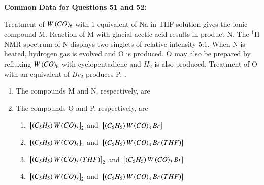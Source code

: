 \documentclass[journal,12pt,onecolumn]{IEEEtran}
\theoremstyle{remark}
\begin{document}
\textbf{Common Data for Questions 51 and 52:}

Treatment of $W\left(CO\right)_6$ with 1 equivalent of Na in THF solution gives the ionic compound M. Reaction of M with glacial acetic acid results in product N. The $^1$H 
 NMR spectrum of N displays two singlets of relative intensity 5:1.
 When N is heated, hydrogen gas is evolved and O is produced.
 O may also be prepared by refluxing $W\left(CO\right)_6$ with cyclopentadiene and $H_2$ is also produced.
 Treatment of O with an equivalent of $Br_2$ produces P. .
 \begin{enumerate}[resume]
\item The compounds M and N, respectively, are
    \begin{enumerate}
        \hfill{}
    \end{enumerate}



\item The compounds O and P, respectively, are
    \begin{enumerate}
     
         \item ${}\left[\left(C_5H_5\right)W\left(CO\right)_3\right]_2$ and ${}\left[\left(C_5H_5\right)W\left(CO\right)_3Br\right]$
        \item ${}\left[\left(C_5H_5\right)W\left(CO\right)_4\right]_2$ and ${}\left[\left(C_5H_5\right)W\left(CO\right)_3Br\left(THF\right)\right]$
        \item ${}\left[\left(C_5H_5\right)W\left(CO\right)_3\left(THF\right)\right]_2$ and ${}\left[\left(C_5H_5\right)W\left(CO\right)_3Br\right]$
        \item ${}\left[\left(C_5H_5\right)W\left(CO\right)_3\right]_2$ and ${}\left[\left(C_5H_5\right)W\left(CO\right)_3Br\left(THF\right)\right]$
        \hfill{}
    \end{enumerate}
\end{enumerate}
\end{document}
